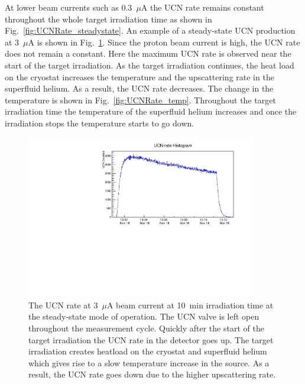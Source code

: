 At lower beam currents such as 0.3~$\mu$A the UCN rate remains
constant throughout the whole target irradiation time as shown in
Fig.~\ref{fig:UCNRate_steadystate}. An example of a steady-state UCN
production at 3~$\mu$A is shown in
Fig.~\ref{fig:UCNRate_steadystate_highbeam}. Since the proton beam
current is high, the UCN rate does not remain a constant. Here the
maximum UCN rate is observed near the start of the target
irradiation. As the target irradiation continues, the heat load on the
cryostat increases the temperature and the upscattering rate in the
superfluid helium. As a result, the UCN rate decreases. The change in
the temperature is shown in Fig.~\ref{fig:UCNRate_temp}. Throughout
the target irradiation time the temperature of the superfluid helium
increases and once the irradiation stops the temperature starts to go
down.


\begin{figure}[h!]
  \centering
  \includegraphics[width=0.9\textwidth]{654_UCNRate.pdf}
  \caption{The UCN rate at 3~$\mu$A beam current at 10~min irradiation
    time at the steady-state mode of operation. The UCN valve is left
    open throughout the measurement cycle. Quickly after the start of
    the target irradiation the UCN rate in the detector goes up. The
    target irradiation creates heatload on the cryostat and superfluid
    helium which gives rise to a slow temperature increase in the
    source. As a result, the UCN rate goes down due to the higher
    upscattering rate.  }
  \label{fig:UCNRate_steadystate_highbeam}
\end{figure}

